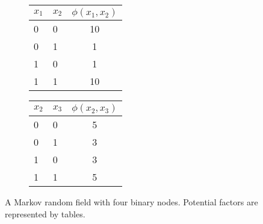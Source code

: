 \begin{figure}[!t]
  \begin{subfigure}{.28\textwidth}
  \end{subfigure}
  \begin{subfigure}{0.3\textwidth}
    \begin{tabular}{llc}
      \toprule
      $x_1$ & $x_2$ & $\phi(x_1, x_2)$ \\ %
      \midrule
      0  &  0  &  10 \\
      0  &  1  &  1 \\
      1  &  0  &  1 \\
      1  &  1  &  10\\
      \bottomrule
    \end{tabular}
  \end{subfigure}
  \begin{subfigure}{0.3\textwidth}
    \begin{tabular}{llc}
      \toprule
      $x_2$ & $x_3$ & $\phi(x_2, x_3)$ \\
      \midrule
      0  &  0  &  5 \\
      0  &  1  &  3 \\
      1  &  0  &  3 \\
      1  &  1  &  5 \\
      \bottomrule
    \end{tabular}
  \end{subfigure}
  \begin{subfigure}{0.03\textwidth}
    \centering
  \end{subfigure}
  \caption{A Markov random field with four binary nodes. Potential factors are represented by tables.}
  \label{chp2:fig:toy_mrf}
\end{figure}

